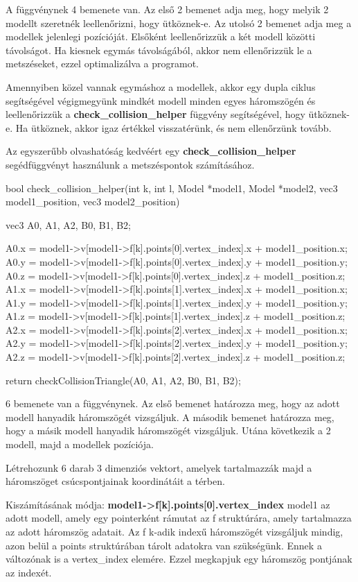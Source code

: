 A függvénynek 4 bemenete van. Az első 2 bemenet adja meg, hogy melyik 2 modellt szeretnék leellenőrizni, hogy ütköznek-e. Az utolsó 2 bemenet adja meg a modellek jelenlegi pozícióját.
Elsőként leellenőrizzük a két modell közötti távolságot. Ha kiesnek egymás távolságából, akkor nem ellenőrizzük le a metszéseket, ezzel optimalizálva a programot. 

Amennyiben közel vannak egymáshoz a modellek, akkor egy dupla ciklus segítségével végigmegyünk mindkét modell minden egyes háromszögén és leellenőrizzük a \textbf{check\_collision\_helper} függvény segítségével, hogy ütköznek-e. Ha ütköznek, akkor igaz értékkel visszatérünk, és nem ellenőrzünk tovább.
\newpage

Az egyszerűbb olvashatóság kedvéért egy \textbf{check\_collision\_helper} segédfüggvényt használunk a metszéspontok számításához.

\begin{cpp}
bool check_collision_helper(int k, int l, Model *model1, 
Model *model2, vec3 model1_position, vec3 model2_position)
{
    vec3 A0, A1, A2, B0, B1, B2;
		
    A0.x = model1->v[model1->f[k].points[0].vertex_index].x 
    + model1_position.x;
    A0.y = model1->v[model1->f[k].points[0].vertex_index].y 
    + model1_position.y;
    A0.z = model1->v[model1->f[k].points[0].vertex_index].z 
    + model1_position.z;
    A1.x = model1->v[model1->f[k].points[1].vertex_index].x 
    + model1_position.x;
    A1.y = model1->v[model1->f[k].points[1].vertex_index].y 
    + model1_position.y;
    A1.z = model1->v[model1->f[k].points[1].vertex_index].z 
    + model1_position.z;
    A2.x = model1->v[model1->f[k].points[2].vertex_index].x 
    + model1_position.x;
    A2.y = model1->v[model1->f[k].points[2].vertex_index].y 
    + model1_position.y;
    A2.z = model1->v[model1->f[k].points[2].vertex_index].z 
    + model1_position.z;

    return checkCollisionTriangle(A0, A1, A2, B0, B1, B2);
}
\end{cpp}

6 bemenete van a függvénynek. Az első bemenet határozza meg, hogy az adott modell hanyadik háromszögét vizsgáljuk. A második bemenet határozza meg, hogy a másik modell hanyadik háromszögét vizsgáljuk. Utána következik a 2 modell, majd a modellek pozíciója.

Létrehozunk 6 darab 3 dimenziós vektort, amelyek tartalmazzák majd a háromszöget csúcspontjainak koordinátáit a térben. 

Kiszámításának módja: \textbf{model1->f[k].points[0].vertex\_index}
model1 az adott modell, amely egy pointerként rámutat az f struktúrára, amely tartalmazza az adott háromszög adatait. Az f k-adik indexű háromszögét vizsgáljuk mindig, azon belül a points struktúrában tárolt adatokra van szükségünk. Ennek a változónak is a vertex\_index elemére. Ezzel megkapjuk egy háromszög pontjának az indexét.

